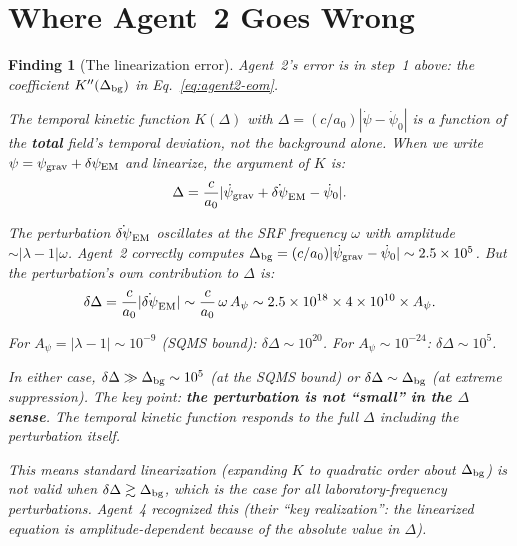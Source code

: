 \documentclass[11pt]{article}
\newtheorem{finding}{Finding}
\newcommand{\ee}[1]{\times 10^{#1}}
\newcommand{\dpsiEM}{\delta\psi_{\rm EM}}
\begin{document}
\section{Where Agent~2 Goes Wrong}
\label{sec:error}

\begin{finding}[The linearization error]
\label{find:linearization}
Agent~2's error is in step~1 above: the coefficient $K''(\Delta_{\rm bg})$
in Eq.~\eqref{eq:agent2-eom}.

The temporal kinetic function $K(\Delta)$ with $\Delta = (c/a_0)|\dot\psi
- \dot\psi_0|$ is a function of the \textbf{total} field's temporal
deviation, not the background alone. When we write $\psi = \psi_{\rm grav}
+ \dpsiEM$ and linearize, the argument of $K$ is:
\begin{equation}
\Delta = \frac{c}{a_0}|\dot\psi_{\rm grav} + \dot{\delta\psi}_{\rm EM}
- \dot\psi_0|.
\end{equation}

The perturbation $\dot{\delta\psi}_{\rm EM}$ oscillates at the SRF
frequency $\omega$ with amplitude $\sim |\lambda-1| \omega$. Agent~2
correctly computes $\Delta_{\rm bg} = (c/a_0)|\dot\psi_{\rm grav} -
\dot\psi_0| \sim 2.5\ee{5}$. But the perturbation's own contribution
to $\Delta$ is:
\begin{equation}
\delta\Delta = \frac{c}{a_0}|\dot{\delta\psi}_{\rm EM}|
\sim \frac{c}{a_0}\,\omega\,A_\psi
\sim 2.5\ee{18} \times 4\ee{10} \times A_\psi.
\end{equation}

For $A_\psi = |\lambda - 1| \sim 10^{-9}$ (SQMS bound):
$\delta\Delta \sim 10^{20}$. For $A_\psi \sim 10^{-24}$:
$\delta\Delta \sim 10^5$.

In either case, $\delta\Delta \gg \Delta_{\rm bg} \sim 10^5$ (at the
SQMS bound) or $\delta\Delta \sim \Delta_{\rm bg}$ (at extreme
suppression). The key point: \textbf{the perturbation is not ``small''
in the $\Delta$ sense}. The temporal kinetic function responds to the
full $\Delta$ including the perturbation itself.

This means standard linearization (expanding $K$ to quadratic order
about $\Delta_{\rm bg}$) is not valid when $\delta\Delta \gtrsim
\Delta_{\rm bg}$, which is the case for all laboratory-frequency
perturbations. Agent~4 recognized this (their ``key realization'':
the linearized equation is amplitude-dependent because of the absolute
value in $\Delta$).


\end{finding}
\end{document}
